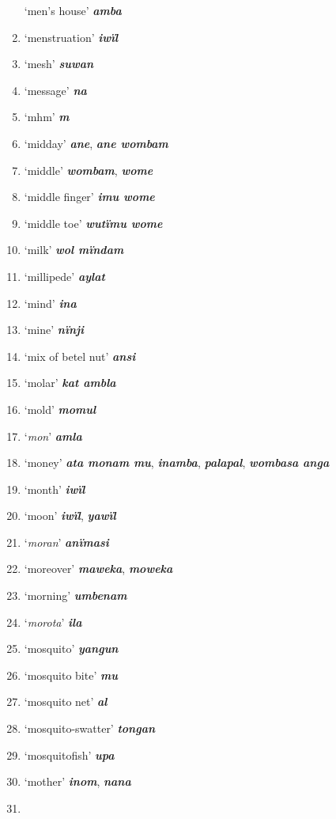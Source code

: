 \begin{enumerate}[noitemsep, label={}, align=left, widest=190, labelsep=1ex,leftmargin=*,itemindent=-10pt]
‘men’s house’ \textbf{\textit{amba}} \item
‘menstruation’ \textbf{\textit{iwïl}} \item
‘mesh’ \textbf{\textit{suwan}} \item
‘message’ \textbf{\textit{na}} \item
‘mhm’ \textbf{\textit{m}} \item
‘midday’ \textbf{\textit{ane}}, \textbf{\textit{ane wombam}} \item
‘middle’ \textbf{\textit{wombam}}, \textbf{\textit{wome}} \item
‘middle finger’ \textbf{\textit{imu wome}} \item
‘middle toe’ \textbf{\textit{wutïmu wome}} \item
‘milk’ \textbf{\textit{wol mïndam}} \item
‘millipede’ \textbf{\textit{aylat}} \item
‘mind’ \textbf{\textit{ina}} \item
‘mine’ \textbf{\textit{nïnji}} \item
‘mix of betel nut’ \textbf{\textit{ansi}} \item
‘molar’ \textbf{\textit{kat ambla}} \item
‘mold’ \textbf{\textit{momul}} \item
‘\textit{mon}’ \textbf{\textit{amla}} \item
‘money’ \textbf{\textit{ata monam mu}}, \textbf{\textit{inamba}}, \textbf{\textit{palapal}}, \textbf{\textit{wombasa anga}} \item
‘month’ \textbf{\textit{iwïl}} \item
‘moon’ \textbf{\textit{iwïl}}, \textbf{\textit{yawïl}} \item
‘\textit{moran}’ \textbf{\textit{anïmasi}} \item
‘moreover’ \textbf{\textit{maweka}}, \textbf{\textit{moweka}} \item
‘morning’ \textbf{\textit{umbenam}} \item
‘\textit{morota}’ \textbf{\textit{ila}} \item
‘mosquito’ \textbf{\textit{yangun}} \item
‘mosquito bite’ \textbf{\textit{mu}} \item
‘mosquito net’ \textbf{\textit{al}} \item
‘mosquito-swatter’ \textbf{\textit{tongan}} \item
‘mosquitofish’ \textbf{\textit{upa}} \item
‘mother’ \textbf{\textit{inom}}, \textbf{\textit{nana}} \item

\end{enumerate}
